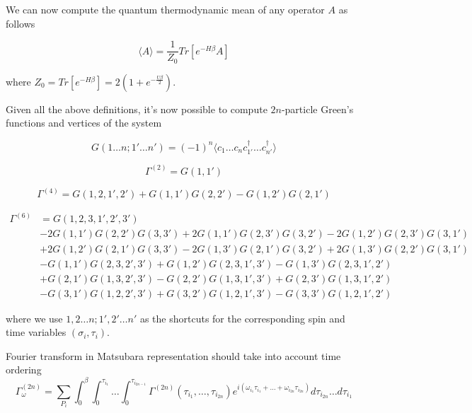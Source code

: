 We can now compute the quantum thermodynamic mean of any operator $A$ as follows

\begin{equation} \langle A\rangle = \frac{1}{Z_0}Tr[e^{-H\beta}A] \end{equation}

where $Z_0 = Tr[e^{-H\beta}] = 2(1+e^{-\frac{U\beta}{2}})$.

Given all the above definitions, it's now possible to compute $2n$-particle Green's functions and vertices of the system

\begin{equation} G(1\dots n;1'\dots n') = (-1)^n \langle c_1\dots c_n c_{1'}^\dagger\dots c_{n'}^\dagger\rangle\end{equation}

\begin{equation} \Gamma^{(2)} = G(1, 1') \end{equation}

\begin{equation} \Gamma^{(4)} = G(1,2,1',2')+G(1,1')G(2,2')-G(1,2')G(2,1')\end{equation}

\begin{equation}\begin{aligned}
\Gamma^{(6)} & = G(1, 2, 3, 1', 2', 3') \\
& -2 G(1, 1') G(2, 2') G(3, 3') 
+2 G(1, 1') G(2, 3') G(3, 2')
-2 G(1, 2') G(2, 3') G(3, 1') \\ 
& +2 G(1, 2') G(2, 1') G(3, 3')
-2 G(1, 3') G(2, 1') G(3, 2')
+2 G(1, 3') G(2, 2') G(3, 1') \\
& -G(1, 1') G(2, 3, 2', 3')
+G(1, 2') G(2, 3, 1', 3')
-G(1, 3') G(2, 3, 1', 2') \\
& +G(2, 1') G(1, 3, 2', 3')
-G(2, 2') G(1, 3, 1', 3')
+G(2, 3') G(1, 3, 1', 2') \\
& -G(3, 1') G(1, 2, 2', 3')
+G(3, 2') G(1, 2, 1', 3')
-G(3, 3') G(1, 2, 1', 2')
\end{aligned}\end{equation}

where we use $1,2\dots n;1',2'\dots n'$ as the shortcuts for the corresponding spin and time variables $(\sigma_i,\tau_i)$.

Fourier transform in Matsubara representation should take into account time ordering
\begin{equation}
  \Gamma_\omega^{(2n)} = \sum_{P_i} \int_0^\beta\int_0^{\tau_{i_1}}\dots\int_0^{\tau_{i_{2n-1}}}\Gamma^{(2n)}(\tau_{i_1},\dots,\tau_{i_{2n}})
  e^{i(\omega_{i_1}\tau_{i_1}+\dots+\omega_{i_{2n}}\tau_{i_{2n}})}d\tau_{i_{2n}}\dots d\tau_{i_1}
\end{equation}

